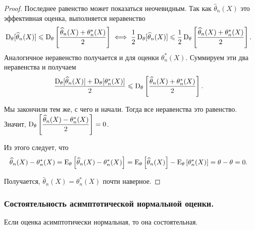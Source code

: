 \begin{proof}
    Последнее равенство может показаться неочевидным. Так как $\widehat{\theta}_n(X)$ это эффективная оценка, выполняется неравенство 
    \begin{equation*}
        \operatorname{D}_{\theta}[\widehat{\theta}_n(X)] \leqslant \operatorname{D}_{\theta}\left[ \dfrac{\widehat{\theta}_n(X) + \theta_n^*(X)}{2} \right] 
        \iff
        \dfrac{1}{2} \operatorname{D}_{\theta}[\widehat{\theta}_n(X)] \leqslant \dfrac{1}{2} \operatorname{D}_{\theta}\left[ \dfrac{\widehat{\theta}_n(X) + \theta_n^*(X)}{2} \right].
    \end{equation*}
    Аналогичное неравенство получается и для оценки $\theta_n^*(X)$. Суммируем эти два неравенства и получаем
    \begin{equation*}
        \dfrac{\operatorname{D}_{\theta}[\widehat{\theta}_n(X)] + \operatorname{D}_{\theta}[\theta_n^*(X)]}{2}
        \leqslant \operatorname{D}_{\theta}\left[ \dfrac{\widehat{\theta}_n(X) + \theta_n^*(X)}{2} \right].
    \end{equation*}

    Мы закончили тем же, с чего и начали. Тогда все неравенства это равенство. Значит, $\operatorname{D}_{\theta}\left[ \dfrac{\widehat{\theta}_n(X) - \theta_n^*(X)}{2} \right] = 0$. 

    Из этого следует, что 
    \begin{equation*}
        \widehat{\theta}_n(X) - \theta_n^*(X)
        = \operatorname{E}_{\theta}\left[ \widehat{\theta}_n(X) - \theta_n^*(X) \right] 
        =
        \operatorname{E}_{\theta}\left[ \widehat{\theta}_n(X) \right] - \operatorname{E}_{\theta}\left[ \theta_n^*(X) \right] 
        = \theta - \theta
        = 0.
    \end{equation*}

    Получается, $\widehat{\theta}_n(X) = \theta_n^*(X)$ почти наверное.
\end{proof}

\subsubsection{Состоятельность асимптотической нормальной оценки.}

\begin{proposition*}
    Если оценка асимптотически нормальная, то она состоятельная.
\end{proposition*}

